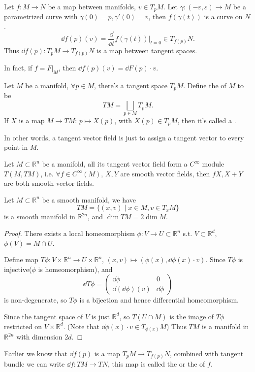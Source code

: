 \begin{definition}
	Let $f: M\to N$ be a map between manifolds, $v\in T_pM$.
	Let  $\gamma: (-\varepsilon, \varepsilon)\to M$ be a parametrized curve with
	$\gamma(0) = p, \gamma'(0) = v$,
	then $f(\gamma(t))$ is a curve on $N$.
	\[
	\dd f(p)(v) = \frac{\dd}{\dd t}f(\gamma(t)) \Big|_{t=0}\in T_{f(p)}N.
	\]
	Thus $\dd f(p): T_p M\to T_{f(p)}N$ is a map between tangent spaces.

	In fact, if $f = F\big|_{M}$, then $\dd f(p)(v) = \dd F(p) \cdot v$.
\end{definition}

\begin{definition}
	Let $M$ be a manifold, $\forall p\in M$, there's a tangent space $T_p M$.
	Define the  of $M$ to be
	\[
	TM = \bigsqcup_{p\in M}T_pM.
	\]
	If $X$ is a map $M \to TM$: $p\mapsto X(p)$,
	with $X(p)\in T_pM$, then
	it's called a .

	In other words, a tangent vector field is just to assign a tangent vector
	to every point in $M$.
\end{definition}

\begin{proposition}
	Let $M \subset \mathbb{R}^{n}$ be a manifold, all its tangent vector
	field form a $C^\infty$ module $T(M, TM)$, i.e.
	$\forall f\in C^\infty(M)$, $X, Y$ are smooth vector fields,
	then $fX, X+Y$ are both smooth vector fields.
\end{proposition}

\begin{proposition}
	Let $M \subset \mathbb{R}^{n}$ be a smooth manifold, we have
	\[
	TM = \{(x, v)\mid x\in M, v\in T_xM\}
	\]
	is a smooth manifold in $\mathbb{R}^{2n}$, and $\dim TM = 2\dim M$.
\end{proposition}
\begin{proof}[Proof]
    There exists a local homeomorphism $\phi: V\to U \subset\mathbb{R}^n$ s.t.
	$V \subset \mathbb{R}^d$, $\phi(V) = M\cap U$.

	Define map $T\phi: V \times  \mathbb{R}^n \to U \times \mathbb{R}^n$,
	$(x, v)\mapsto (\phi(x), \dd \phi(x)\cdot v)$.
	Since $T\phi$ is injective($\phi$ is homeomorphism), and
	\[
	\dd T\phi = \begin{pmatrix}
		\dd \phi & 0\\ \dd(\dd \phi)(v) & \dd \phi
	\end{pmatrix}
	\]
	is non-degenerate, so $T\phi$ is a bijection and hence differential homeomorphism.

	Since the tangent space of $V$ is just $\mathbb{R}^{d}$,
	so $T(U\cap M)$ is the image of $T\phi$ restricted on $V \times \mathbb{R}^{d}$.
	(Note that $\dd \phi(x) \cdot v\in T_{\phi(x)} M$)
	Thus $T M$ is a manifold in $\mathbb{R}^{2n}$ with dimension $2d$.
\end{proof}
\begin{definition}
	Earlier we know that $\dd f (p)$ is a map $T_p M\to T_{f(p)}N$,
	combined with tangent bundle we can write $\dd f: TM \to TN$,
	this map is called the  or the  of $f$.
\end{definition}


